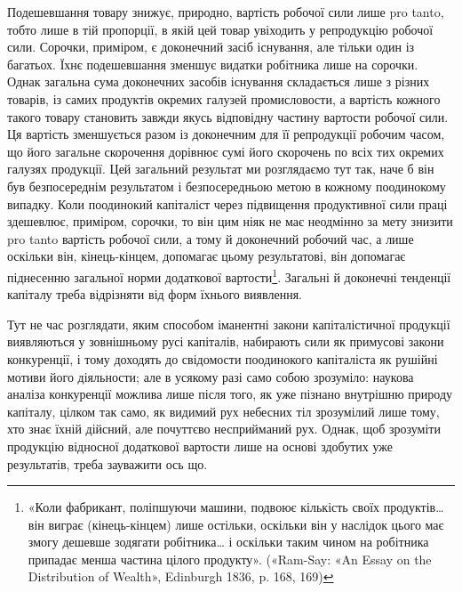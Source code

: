 Подешевшання товару знижує, природно, вартість робочої
сили лише pro tanto, тобто лише в тій пропорції, в якій цей товар
увіходить у репродукцію робочої сили. Сорочки, приміром, є
доконечний засіб існування, але тільки один із багатьох. Їхнє
подешевшання зменшує видатки робітника лише на сорочки.
Однак загальна сума доконечних засобів існування складається
лише з різних товарів, із самих продуктів окремих галузей
промисловости, а вартість кожного такого товару становить завжди
якусь відповідну частину вартости робочої сили. Ця вартість
зменшується разом із доконечним для її репродукції робочим
часом, що його загальне скорочення дорівнює сумі його скорочень
по всіх тих окремих галузях продукції. Цей загальний результат
ми розглядаємо тут так, наче б він був безпосереднім результатом
і безпосередньою метою в кожному поодинокому випадку. Коли
поодинокий капіталіст через підвищення продуктивної сили праці
здешевлює, приміром, сорочки, то він цим ніяк не має неодмінно за
мету знизити pro tanto вартість робочої сили, а тому й доконечний
робочий час, а лише оскільки він, кінець-кінцем, допомагає
цьому результатові, він допомагає піднесенню загальної норми
додаткової вартости\footnote{
«Коли фабрикант, поліпшуючи машини, подвоює кількість своїх
продуктів\dots{} він виграє (кінець-кінцем) лише остільки,
оскільки він у наслідок цього має змогу дешевше зодягати
робітника\dots{} і оскільки таким
чином на робітника припадає менша частина цілого продукту». («Ram-Say:
«An Essay on the Distribution of Wealth», Edinburgh 1836, p. 168, 169)
}.
Загальні й доконечні тенденції капіталу
треба відрізняти від форм їхнього виявлення.

Тут не час розглядати, яким способом іманентні закони капіталістичної
продукції виявляються у зовнішньому русі капіталів,
набирають сили як примусові закони конкуренції, і тому доходять
до свідомости поодинокого капіталіста як рушійні мотиви
його діяльности; але в усякому разі само собою зрозуміло: наукова
аналіза конкуренції можлива лише після того, як уже пізнано
внутрішню природу капіталу, цілком так само, як видимий рух
небесних тіл зрозумілий лише тому, хто знає їхній дійсний, але
почуттєво несприйманий рух. Однак, щоб зрозуміти продукцію
відносної додаткової вартости лише на основі здобутих уже результатів,
треба зауважити ось що.

